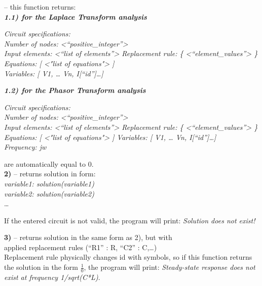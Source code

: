 \documentclass[11pt]{article}
\begin{document}
 \textrm{--} this function
returns:\\

\textbf{\emph{1.1) for the Laplace Transform analysis}}

\emph{Circuit specifications: \\
Number of nodes: \textless{}``positive\_integer''\textgreater{}\\
Input elements: \textless{}``list of
elements''\textgreater{}\emph{\hfill\break
}Replacement rule: \{ \textless{}``element\_values''\textgreater{}
\}\emph{\hfill\break
}Equations: {[} <"list of equations"> {]} \\
Variables: {[} V1, \ldots{} Vn, I{[}``id''{]}\ldots{]}}

\textbf{\emph{1.2) for the Phasor Transform analysis}}

\emph{Circuit
specifications: \\
Number of nodes: \textless{}``positive\_integer''\textgreater{}\\
Input elements: \textless{}``list of
elements''\textgreater{}\emph{\hfill\break
}Replacement rule: \{ \textless{}``element\_values''\textgreater{}
\}\emph{\hfill\break
}Equations: {[} <"list of equations"> {]}\hfill\break
Variables: {[} V1, \ldots{} Vn, I{[}``id''{]}\ldots{]}\\
Frequency: jw}

\newpage

 are automatically equal to 0.\\

\textbf{2)}  \textrm{--} returns solution in
form:\\
\emph{variable1: solution(variable1)}\\
\emph{variable2: solution(variable2)}\\
\ldots{}

If the entered circuit is not valid, the program will print: \emph{Solution does not exist!}

\textbf{3)}  \textrm{--} returns solution in the same form as 2), but with\\ 
applied replacement rules
(``R1'' : R, ``C2'' : C,\ldots) \\[1.5ex]
Replacement rule physically changes id with symbols, so
if this function returns the solution in the form \(\frac{1}{0}\), the program will print: \emph{Steady-state response does not exist at frequency 1/sqrt(C*L)}.\\[1.5ex]
\end{document}
